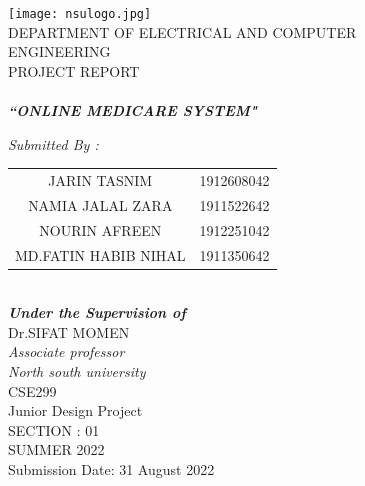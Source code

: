 \documentclass[14pt,a4paper,calibribody]{article}
\begin{document}
\begin{figure}[h]


\centering
\texttt{[image: nsulogo.jpg]}\\
\centering
{\large DEPARTMENT OF ELECTRICAL AND COMPUTER ENGINEERING }\\
\vspace{0.5in}
{\large PROJECT REPORT}\\ \vspace{0.09in}{ON}\\ 
\vspace{0.1in}
{\large{\textbf{\emph{``ONLINE MEDICARE SYSTEM"}}}}
\begin{center}
\vspace{0.3in}
{\emph{Submitted By :}}\\ 
\vspace{0.1in}
\begin{tabular}{c c}
\vspace{0.1in} 
\large JARIN TASNIM        & 1912608042\\
\large NAMIA JALAL ZARA    & 1911522642\\
\large NOURIN AFREEN       & 1912251042\\
\large MD.FATIN HABIB NIHAL& 1911350642\\
\end{tabular}\\
\vspace{0.5in}
{\textbf{\emph{\large Under the Supervision of}}}\\
\vspace{0.1in}
{Dr.SIFAT MOMEN}\\
{\emph{Associate professor\\
North south university}}\\ 
\vspace{0.3in}
{CSE299 \\ Junior Design Project \\ SECTION : 01} \\ 
\vspace{0.1in}
{\small SUMMER 2022}\\
\vspace{0.30in}
\large{Submission Date: 31 August 2022}
\end{center}
\end{figure}
\end{document}
